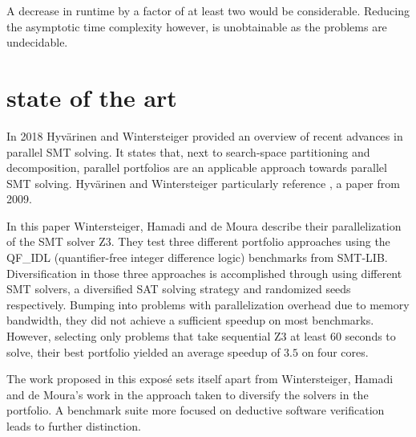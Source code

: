 \documentclass{scrartcl}
\begin{document}
A decrease in runtime by a factor of at least two would be considerable.
Reducing the asymptotic time complexity however, is unobtainable
as the problems are undecidable.

\section{state of the art}
In 2018 Hyvärinen and Wintersteiger \cite{HJW2018} provided an overview of
recent advances in parallel SMT solving.
It states that, next to search-space partitioning and decomposition,
parallel portfolios are an applicable approach towards parallel SMT solving.
Hyvärinen and Wintersteiger particularly reference \cite{WHM2009}, a paper from 2009.

In this paper Wintersteiger, Hamadi and de Moura describe their parallelization of the
SMT solver Z3.
They test three different portfolio approaches using the QF\_IDL
(quantifier-free integer difference logic) benchmarks from SMT-LIB.
Diversification in those three approaches is accomplished through using
different SMT solvers, a diversified SAT solving strategy
and randomized seeds respectively.
Bumping into problems with parallelization overhead due to memory bandwidth,
they did not achieve a sufficient speedup on most benchmarks.
However, selecting only problems that take sequential Z3 at least 60 seconds to solve,
their best portfolio yielded an average speedup of \(3.5\) on four cores.

The work proposed in this exposé sets itself apart from Wintersteiger, Hamadi and de Moura's work
in the approach taken to diversify the solvers in the portfolio.
A benchmark suite more focused on deductive software verification leads to further distinction.
\end{document}
